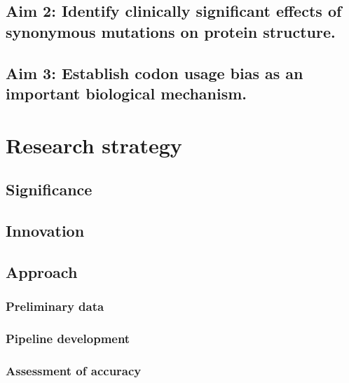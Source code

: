 \documentclass[11pt]{nih}
\begin{document}
\subsection{Aim 2: Identify clinically significant effects of synonymous mutations on protein structure.}

\subsection{Aim 3: Establish codon usage bias as an important biological mechanism.}
 

\section{Research strategy}


\subsection{Significance}



\subsection{Innovation}



\subsection{Approach}

\subsubsection{Preliminary data}

\subsubsection{Pipeline development}

\subsubsection{Assessment of accuracy}
\end{document}
